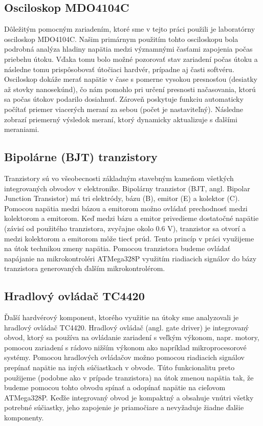 \subsection{Osciloskop MDO4104C}
Dôležitým pomocným zariadením, ktoré sme v tejto práci použili je laboratórny osciloskop MDO4104C. Našim primárnym použitím tohto osciloskopu bola podrobná analýza hladiny napätia medzi významnými časťami zapojenia počas priebehu útoku. Vďaka tomu bolo možné pozorovať stav zariadení počas útoku a následne tomu prispôsobovať útočiaci hardvér, prípadne aj časti softvéru. Osciloskop dokáže merať napätie v čase s pomerne vysokou presnosťou (desiatky až stovky nanosekúnd), čo nám pomohlo pri určení presnosti načasovania, ktorú sa počas útokov podarilo dosiahnuť. Zároveň poskytuje funkciu automaticky počítať priemer viacerých meraní za sebou (počet je nastaviteľný). Následne zobrazí priemerný výsledok meraní, ktorý dynamicky aktualizuje s ďalšími meraniami.

\subsection{Bipolárne (BJT) tranzistory}
Tranzistory sú vo všeobecnosti základným stavebným kameňom všetkých integrovaných obvodov v elektronike. Bipolárny tranzistor (BJT, angl. Bipolar Junction Transistor) má tri elektródy, bázu (B), emitor (E) a kolektor (C). Pomocou napätia medzi bázou a emitorom možno ovládať prechodnosť medzi kolektorom a emitorom. Keď medzi bázu a emitor privedieme dostatočné napätie (závisí od použitého tranzistora, zvyčajne okolo 0.6 V), tranzistor sa otvorí a medzi kolektorom a emitorom môže tiecť prúd. Tento princíp v práci využijeme na útok technikou zmeny napätia. Pomocou tranzistora budeme ovládať napájanie na mikrokontroléri ATMega328P využitím riadiacich signálov do bázy tranzistora generovaných ďalším mikrokontrolérom.

\subsection{Hradlový ovládač TC4420}
Ďalší hardvérový komponent, ktorého využitie na útoky sme analyzovali je hradlový ovládač TC4420. Hradlový ovládač (angl. gate driver) je integrovaný obvod, ktorý sa používa na ovládanie zariadení s veľkým výkonom, napr. motory, pomocou zariadení s rádovo nižším výkonom ako napríklad mikroprocesorové systémy. Pomocou hradlových ovládačov možno pomocou riadiacich signálov prepínať napätie na iných súčiastkach v obvode. Túto funkcionalitu preto použijeme (podobne ako v prípade tranzistora) na útok zmenou napätia tak, že budeme pomocou tohto obvodu spínať a odopínať napätie na cieľovom ATMega328P. Keďže integrovaný obvod je kompaktný a obsahuje vnútri všetky potrebné súčiastky, jeho zapojenie je priamočiare a nevyžaduje žiadne ďalšie komponenty.